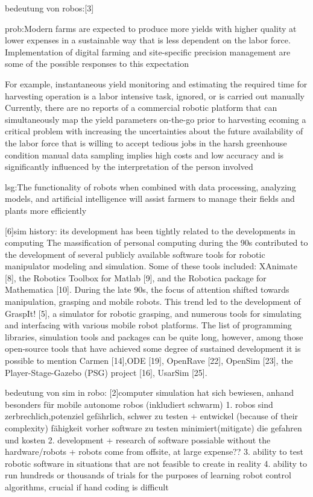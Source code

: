 \documentclass[german,version-2020-11]{uzl-thesis}
\begin{document}
    bedeutung von robos:[3]
		
		prob:Modern farms are expected to produce more yields with higher quality at lower expenses in a sustainable way that is less dependent on the labor force. Implementation of digital farming and site-specific precision management are some of the possible responses to this expectation
		
		For example,  instantaneous yield monitoring and estimating the required time for harvesting operation is a labor intensive task, ignored, or is carried out manually
		Currently, there are no reports of a commercial robotic platform that can simultaneously map the yield parameters on-the-go prior to harvesting
		ecoming a critical problem with increasing the uncertainties about the future availability of the labor force that is willing to accept tedious jobs in the harsh greenhouse condition
		manual data sampling implies high costs and low accuracy and is significantly influenced by the interpretation of the person involved
		
		lsg:The functionality of robots when combined with data processing, analyzing models, and artificial intelligence will assist farmers to manage their fields and plants more efficiently


    [6]sim history:
      its development has been tightly related to the developments in computing
      The massification of personal computing during the 90s contributed to the development of several publicly available software tools for robotic manipulator 
	modeling and simulation. Some of these tools included: XAnimate [8], the Robotics Toolbox for Matlab [9], and the Robotica package for Mathematica [10]. 
      During the late 90s, the focus of attention shifted towards manipulation, grasping and mobile robots. 
	This trend led to the development of GraspIt! [5], a simulator for robotic grasping, and numerous tools for simulating and interfacing with various mobile robot platforms. 
	The list of programming libraries, simulation tools and packages can be quite long, however, among those open-source tools that have achieved some degree of sustained development it is 	possible to mention Carmen [14],ODE [19], OpenRave [22], OpenSim [23], the Player-Stage-Gazebo (PSG) project [16], UsarSim [25]. 

  bedeutung von sim in robo:
	[2]computer simulation hat sich bewiesen, anhand
		besonders für mobile autonome robos (inkludiert schwarm)
		1. robos sind zerbrechlich,potenziel gefährlich, schwer zu testen + entwickel (because of their complexity)
		fähigkeit vorher software zu testen minimiert(mitigate) die gefahren und kosten
		2. development + research of software possiable without the hardware/robots
			+ robots come from offsite, at large expense??
		3. ability to test robotic software in situations that are not feasible to create in reality
		4. ability to run hundreds or thousands of trials for the purposes of learning robot control algorithms, crucial if hand coding is difficult
	
\end{document}
